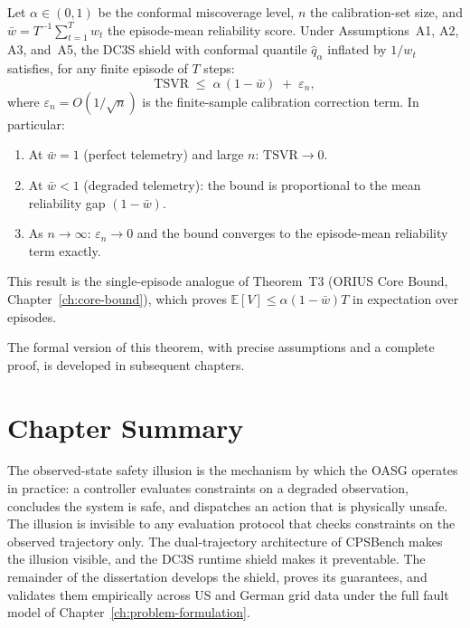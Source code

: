 \begin{theorem}
\label{thm:dc3s-informal}
Let $\alpha \in (0,1)$ be the conformal miscoverage level, $n$ the
calibration-set size, and $\bar{w} = T^{-1}\sum_{t=1}^T w_t$ the
episode-mean reliability score.  Under Assumptions~A1, A2, A3, and~A5,
the DC3S shield with conformal quantile $\hat{q}_\alpha$ inflated by
$1/w_t$ satisfies, for any finite episode of $T$ steps:
\[
  \mathrm{TSVR} \;\le\; \alpha\,(1 - \bar{w}) \;+\; \varepsilon_n,
\]
where $\varepsilon_n = O(1/\sqrt{n})$ is the finite-sample calibration
correction term.  In particular:
\begin{enumerate}
  \item At $\bar{w} = 1$ (perfect telemetry) and large $n$:
    $\mathrm{TSVR} \to 0$.
  \item At $\bar{w} < 1$ (degraded telemetry): the bound is
    proportional to the mean reliability gap $(1 - \bar{w})$.
  \item As $n \to \infty$: $\varepsilon_n \to 0$ and the bound
    converges to the episode-mean reliability term exactly.
\end{enumerate}
This result is the single-episode analogue of Theorem~T3
(ORIUS Core Bound, Chapter~\ref{ch:core-bound}), which proves
$\mathbb{E}[V] \le \alpha(1-\bar{w})T$ in expectation over episodes.
\end{theorem}

The formal version of this theorem, with precise assumptions and a
complete proof, is developed in subsequent chapters.

\section{Chapter Summary}

The observed-state safety illusion is the mechanism by which the OASG
operates in practice: a controller evaluates constraints on a degraded
observation, concludes the system is safe, and dispatches an action that
is physically unsafe.  The illusion is invisible to any evaluation
protocol that checks constraints on the observed trajectory only.  The
dual-trajectory architecture of CPSBench makes the illusion visible, and
the DC3S runtime shield makes it preventable.  The remainder of the
dissertation develops the shield, proves its guarantees, and validates
them empirically across US and German grid data under the full fault model
of Chapter~\ref{ch:problem-formulation}.
